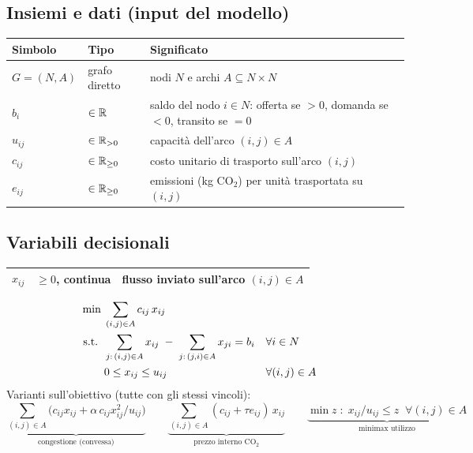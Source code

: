 \subsection*{Insiemi e dati (input del modello)}
\begin{center}\small
\begin{tabular}{llp{7.4cm}}
\toprule
Simbolo & Tipo & Significato \\
\midrule
$G=(N,A)$ & grafo diretto & nodi $N$ e archi $A \subseteq N \times N$ \\
$b_i$ & $\in \mathbb{R}$ & saldo del nodo $i \in N$: offerta se $> 0$, domanda se $< 0$,
                   transito se $= 0$ \\
$u_{ij}$ & $\in \mathbb{R}_{> 0}$ & capacità dell'arco $(i,j) \in A$ \\
$c_{ij}$ & $\in \mathbb{R}_{\ge 0}$ & costo unitario di trasporto sull'arco $(i,j)$ \\
$e_{ij}$ & $\in \mathbb{R}_{\ge 0}$ & emissioni (kg CO$_2$) per unità trasportata su $(i,j)$ \\
\bottomrule
\end{tabular}
\end{center}

\subsection*{Variabili decisionali}
\begin{center}\small
\begin{tabular}{llp{7.4cm}}
\toprule
$x_{ij}$ & $\ge 0$, continua & flusso inviato sull'arco $(i,j) \in A$ \\
\bottomrule
\end{tabular}
\end{center}

\begin{modello}
\begin{align}
\min\;& \sum_{(i,j) \in A} c_{ij}\, x_{ij} \notag\\
\text{s.t.}\;\;
& \sum_{j:\,(i,j)\in A} x_{ij} \;-\; \sum_{j:\,(j,i)\in A} x_{ji} = b_i && \forall i \in N
   \label{eq:flusso}\\
& 0 \le x_{ij} \le u_{ij} && \forall (i,j) \in A \notag
\end{align}
Varianti sull'obiettivo (tutte con gli stessi vincoli):
\[
\underbrace{\textstyle\sum_{(i,j) \in A} \bigl(c_{ij} x_{ij} + \alpha\, c_{ij} x_{ij}^2 / u_{ij}\bigr)}_{\text{congestione (convessa)}}
\qquad
\underbrace{\textstyle\sum_{(i,j) \in A} (c_{ij} + \tau e_{ij})\, x_{ij}}_{\text{prezzo interno CO$_2$}}
\qquad
\underbrace{\min z \;:\; x_{ij}/u_{ij} \le z \;\; \forall (i,j) \in A}_{\text{minimax utilizzo}}
\]
\end{modello}

